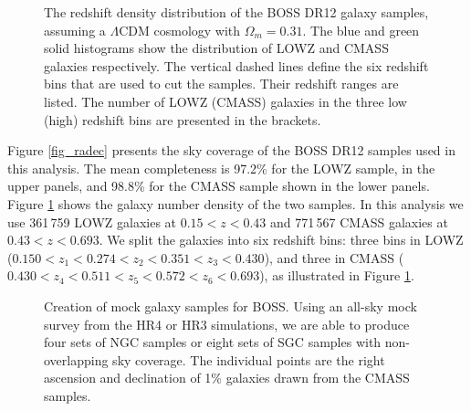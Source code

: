 \documentclass[iop]{emulateapj}
\begin{document}
\begin{figure}
   \caption{\label{fig_nbar}
      The redshift density distribution of the BOSS DR12 galaxy samples, assuming a $\Lambda$CDM cosmology with $\Omega_m=0.31$.
      The blue and green solid histograms show the distribution of LOWZ and CMASS galaxies respectively. 
      The vertical dashed lines define the six redshift bins that are used to cut the samples.
      Their redshift ranges are listed.
      The number of LOWZ (CMASS) galaxies in the three low (high) redshift bins are presented in the brackets.
      }
\end{figure}

Figure \ref{fig_radec} presents the sky coverage of the BOSS DR12 samples used in this analysis. 
The mean completeness is 97.2\% for the LOWZ sample, in the upper panels, and 98.8\% for the CMASS sample shown in the lower panels.
Figure \ref{fig_nbar} shows the galaxy number density of the two samples.
In this analysis we use 361\,759 LOWZ galaxies at $0.15<z <0.43$ and 
771\,567 CMASS galaxies at $0.43< z < 0.693$.
We split the galaxies into six redshift bins: 
three bins in LOWZ ($0.150<z_1<0.274<z_2<0.351<z_3<0.430$), 
and three in CMASS ($0.430<z_4<0.511<z_5<0.572<z_6<0.693$), 
as illustrated in Figure \ref{fig_nbar}.

\begin{figure}
   \caption{\label{fig_mock}
      Creation of mock galaxy samples for BOSS.
      Using an all-sky mock survey from the HR4 or HR3 simulations,
       we are able to produce four sets of NGC samples or eight sets of SGC samples with non-overlapping sky coverage.
      The individual points are the right ascension and declination of 1\% galaxies drawn from the CMASS samples.
      }
\end{figure}
\end{document}
